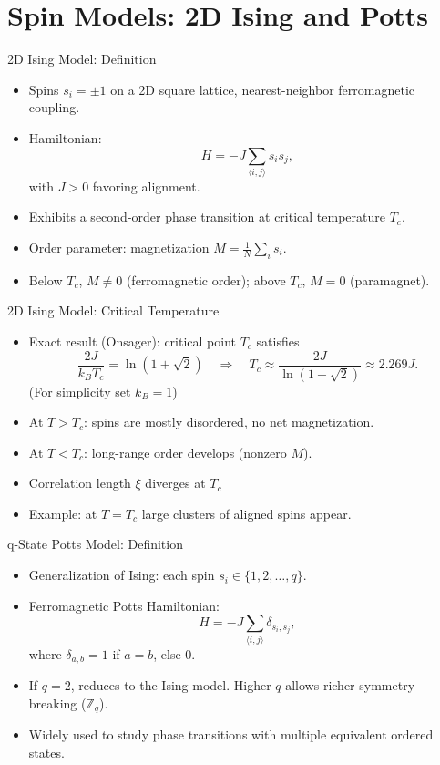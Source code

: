 \documentclass{beamer}
\begin{document}
\section{Spin Models: 2D Ising and Potts}

\begin{frame}{2D Ising Model: Definition}
 \begin{itemize}
   \item Spins $s_i = \pm 1$ on a 2D square lattice, nearest-neighbor ferromagnetic coupling.
   \item Hamiltonian:
     \[
       H = -J \sum_{\langle i,j\rangle} s_i s_j,
     \]
     with $J>0$ favoring alignment.
   \item Exhibits a second-order phase transition at critical temperature $T_c$.
   \item Order parameter: magnetization $M = \frac{1}{N}\sum_i s_i$.
   \item Below $T_c$, $M\neq0$ (ferromagnetic order); above $T_c$, $M=0$ (paramagnet).
 \end{itemize}
\end{frame}

\begin{frame}{2D Ising Model: Critical Temperature}
 \begin{itemize}
   \item Exact result (Onsager): critical point $T_c$ satisfies
     \[
       \frac{2J}{k_B T_c} = \ln(1+\sqrt{2}) \quad\Rightarrow\quad T_c \approx \frac{2J}{\ln(1+\sqrt{2})}\approx 2.269J.
     \]
     (For simplicity set $k_B=1$) 
   \item At $T>T_c$: spins are mostly disordered, no net magnetization.
   \item At $T<T_c$: long-range order develops (nonzero $M$).
   \item Correlation length $\xi$ diverges at $T_c$ 
   \item Example: at $T=T_c$ large clusters of aligned spins appear.
 \end{itemize}
\end{frame}

\begin{frame}{q-State Potts Model: Definition}
 \begin{itemize}
   \item Generalization of Ising: each spin $s_i \in \{1,2,\dots,q\}$.
   \item Ferromagnetic Potts Hamiltonian:
     \[
       H = -J \sum_{\langle i,j\rangle} \delta_{s_i,s_j},
     \]
     where $\delta_{a,b}=1$ if $a=b$, else $0$.
   \item If $q=2$, reduces to the Ising model. Higher $q$ allows richer symmetry breaking ($\mathbb{Z}_q$).
   \item Widely used to study phase transitions with multiple equivalent ordered states.
 \end{itemize}
\end{frame}
\end{document}
